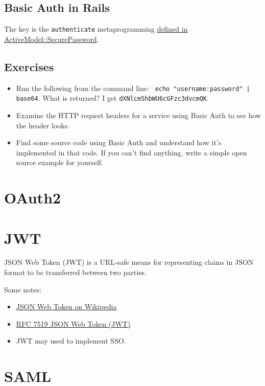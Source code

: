 \documentclass{article}
\begin{document}
\subsection{Basic Auth in Rails}

The key is the \texttt{authenticate} metaprogramming
\href{https://github.com/rails/rails/blob/fbe2433be6e052a1acac63c7faf287c52ed3c5ba/activemodel/lib/active_model/secure_password.rb#L119}{%
  defined in ActiveModel::SecurePassword}.


\subsection{Exercises}

\begin{itemize}
  \item Run the following from the command line: \texttt{%
      echo "username:password" | base64}. What is returned?
    I get \texttt{dXNlcm5hbWU6cGFzc3dvcmQK}.
  \item Examine the HTTP request headers for a service using Basic Auth
    to see how the header looks.
  \item Find some source code using Basic Auth and understand how
    it's implemented in that code. If you can't find anything, write
    a simple open source example for yourself.
\end{itemize}

\section{OAuth2}


\section{JWT}

JSON Web Token (JWT) is a URL-safe means for representing
claims in JSON format to be transferred between two parties.

Some notes:

\begin{itemize}
  \item \href{https://en.wikipedia.org/wiki/JSON_Web_Token}{%
     JSON Web Token on Wikipedia}
  \item \href{https://tools.ietf.org/html/rfc7519}{%
     RFC 7519 JSON Web Token (JWT)}
 \item JWT may used to implement SSO.
\end{itemize}


\section{SAML}
\end{document}
